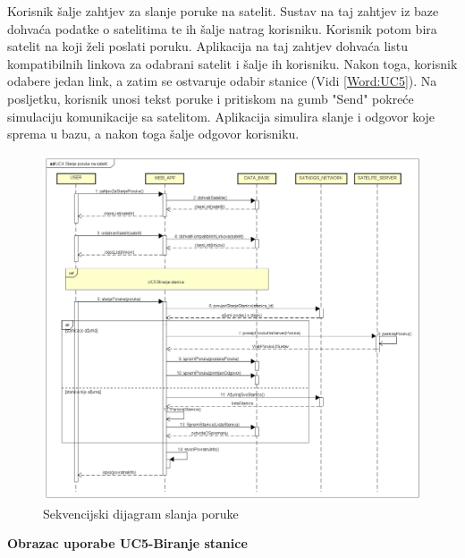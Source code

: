 			{Korisnik šalje zahtjev za slanje poruke na satelit. Sustav na taj zahtjev iz baze dohvaća podatke o satelitima te ih šalje natrag korisniku. Korisnik potom bira satelit na koji želi poslati poruku. Aplikacija na taj zahtjev dohvaća listu kompatibilnih linkova za odabrani satelit i šalje ih korisniku. Nakon toga, korisnik odabere jedan link, a zatim se ostvaruje odabir stanice (Vidi \ref{Word:UC5}). Na posljetku, korisnik unosi tekst poruke i pritiskom na gumb "Send" pokreće simulaciju komunikacije sa satelitom. Aplikacija simulira slanje i odgovor koje sprema u bazu, a nakon toga šalje odgovor korisniku. }
		
				\begin{figure}[H]
					\includegraphics[width=\linewidth]{Sekvencijski2.png}
					\caption{Sekvencijski dijagram slanja poruke}
					\label{fig:Sekvencijski poruka}
				\end{figure}
			\newpage
			\textbf{Obrazac uporabe UC5-Biranje stanice}
			
